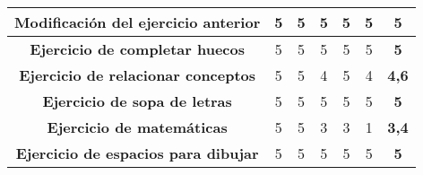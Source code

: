 \begin{table}[H]
{\begin{tabular}{c|cccccc|}
            \multicolumn{1}{|c|}{\textbf{Modificación del ejercicio anterior}} & \multicolumn{1}{c|}{5}                                                                                                                                                                                & \multicolumn{1}{c|}{5}                  & \multicolumn{1}{c|}{5}                  & \multicolumn{1}{c|}{5}                  & \multicolumn{1}{c|}{5}                  & \textbf{5}     \\ \hline
            \multicolumn{1}{|c|}{\textbf{Ejercicio de completar huecos}}       & \multicolumn{1}{c|}{5}                                                                                                                                                                                & \multicolumn{1}{c|}{5}                  & \multicolumn{1}{c|}{5}                  & \multicolumn{1}{c|}{5}                  & \multicolumn{1}{c|}{5}                  & \textbf{5}     \\ \hline
            \multicolumn{1}{|c|}{\textbf{Ejercicio de relacionar conceptos}}   & \multicolumn{1}{c|}{5}                                                                                                                                                                                & \multicolumn{1}{c|}{5}                  & \multicolumn{1}{c|}{4}                  & \multicolumn{1}{c|}{5}                  & \multicolumn{1}{c|}{4}                  & \textbf{4,6}   \\ \hline
            \multicolumn{1}{|c|}{\textbf{Ejercicio de sopa de letras}}         & \multicolumn{1}{c|}{5}                                                                                                                                                                                & \multicolumn{1}{c|}{5}                  & \multicolumn{1}{c|}{5}                  & \multicolumn{1}{c|}{5}                  & \multicolumn{1}{c|}{5}                  & \textbf{5}     \\ \hline
            \multicolumn{1}{|c|}{\textbf{Ejercicio de matemáticas}}            & \multicolumn{1}{c|}{5}                                                                                                                                                                                & \multicolumn{1}{c|}{5}                  & \multicolumn{1}{c|}{3}                  & \multicolumn{1}{c|}{3}                  & \multicolumn{1}{c|}{1}                  & \textbf{3,4}   \\ \hline
            \multicolumn{1}{|c|}{\textbf{Ejercicio de espacios para dibujar}}  & \multicolumn{1}{c|}{5}                                                                                                                                                                                & \multicolumn{1}{c|}{5}                  & \multicolumn{1}{c|}{5}                  & \multicolumn{1}{c|}{5}                  & \multicolumn{1}{c|}{5}                  & \textbf{5}     \\ \hline

\end{tabular}}
\end{table}
